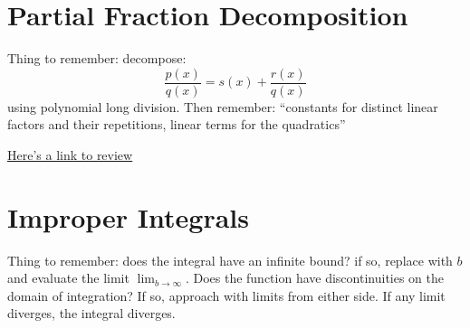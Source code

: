 
\section{Partial Fraction Decomposition}
\begin{aun}
Thing to remember: decompose:
\[
\frac{p(x)}{q(x)} = s(x) + \frac{r(x)}{q(x)}
\]
using polynomial long division. Then remember: ``constants for distinct linear factors and their repetitions, linear terms for the quadratics''
\end{aun}
\begin{aun}
\href{https://www.math.ucdavis.edu/~kouba/CalcTwoDIRECTORY/partialfracdirectory/PartialFrac.html}{Here's a link to review}
\end{aun}




\section{Improper Integrals}
\begin{aun}
Thing to remember: does the integral have an infinite bound? if so, replace with $b$ and evaluate the limit $\lim_{b \to \infty}$. Does the function have discontinuities on the domain of integration? If so, approach with limits from either side. If any limit diverges, the integral diverges.
\end{aun}



\ans{
\[
\lim_{b \to \infty} \lrb{-\frac13 e^{-x^3} }^b_0 = \frac13
\]
}


